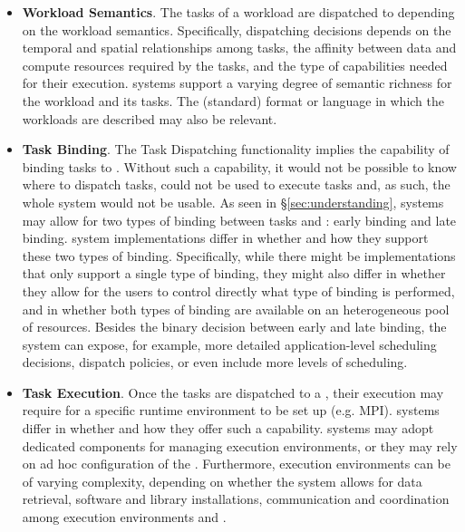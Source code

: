 \documentclass{sig-alternate}
\begin{document}
\begin{itemize}
\item \textbf{Workload Semantics}. The tasks of a workload are dispatched to
  \pilots depending on the workload semantics. Specifically, dispatching
  decisions depends on the temporal and spatial relationships among tasks, the
  affinity between data and compute resources required by the tasks, and the
  type of capabilities needed for their execution. \pilot systems support a
  varying degree of semantic richness for the workload and its tasks. The
  (standard) format or language in which the workloads are described may also be
  relevant.



\item \textbf{Task Binding}. The Task Dispatching functionality implies the
  capability of binding tasks to \pilots. Without such a capability, it would
  not be possible to know where to dispatch tasks, \pilots could not be used to
  execute tasks and, as such, the whole \pilot system would not be usable. As
  seen in \S\ref{sec:understanding}, \pilot systems may allow for two types of
  binding between tasks and \pilots: early binding and late binding. \pilot
  system implementations differ in whether and how they support these two types
  of binding. Specifically, while there might be implementations that only
  support a single type of binding, they might also differ in whether they allow
  for the users to control directly what type of binding is performed, and in
  whether both types of binding are available on an heterogeneous pool of
  resources. Besides the binary decision between early and late binding, the
  \pilot system can expose, for example, more detailed application-level
  scheduling decisions, dispatch policies, or even include more levels of
  scheduling.

\item \textbf{Task Execution}. Once the tasks are dispatched to a \pilot, their
  execution may require for a specific runtime environment to be set up (e.g.
  MPI). \pilot systems differ in whether and how they offer such a capability.
  \pilot systems may adopt dedicated components for managing execution
  environments, or they may rely on ad hoc configuration of the \pilots.
  Furthermore, execution environments can be of varying complexity, depending on
  whether the \pilot system allows for data retrieval, software and library
  installations, communication and coordination among execution environments and
  \pilots.


\end{itemize}
\end{document}

